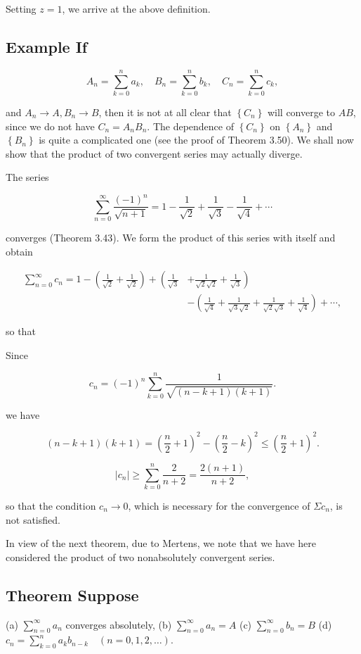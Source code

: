 \documentclass[10pt]{article}
\begin{document}
Setting $z=1$, we arrive at the above definition.

\subsection{Example If}
$$
A_{n}=\sum_{k=0}^{n} a_{k}, \quad B_{n}=\sum_{k=0}^{n} b_{k}, \quad C_{n}=\sum_{k=0}^{n} c_{k},
$$

and $A_{n} \rightarrow A, B_{n} \rightarrow B$, then it is not at all clear that $\left\{C_{n}\right\}$ will converge to $A B$, since we do not have $C_{n}=A_{n} B_{n}$. The dependence of $\left\{C_{n}\right\}$ on $\left\{A_{n}\right\}$ and $\left\{B_{n}\right\}$ is quite a complicated one (see the proof of Theorem 3.50). We shall now show that the product of two convergent series may actually diverge.

The series

$$
\sum_{n=0}^{\infty} \frac{(-1)^{n}}{\sqrt{n+1}}=1-\frac{1}{\sqrt{2}}+\frac{1}{\sqrt{3}}-\frac{1}{\sqrt{4}}+\cdots
$$

converges (Theorem 3.43). We form the product of this series with itself and obtain

$$
\begin{aligned}
\sum_{n=0}^{\infty} c_{n}=1-\left(\frac{1}{\sqrt{2}}+\frac{1}{\sqrt{2}}\right)+\left(\frac{1}{\sqrt{3}}\right. & \left.+\frac{1}{\sqrt{2} \sqrt{2}}+\frac{1}{\sqrt{3}}\right) \\
& -\left(\frac{1}{\sqrt{4}}+\frac{1}{\sqrt{3} \sqrt{2}}+\frac{1}{\sqrt{2} \sqrt{3}}+\frac{1}{\sqrt{4}}\right)+\cdots,
\end{aligned}
$$

so that

Since

$$
c_{n}=(-1)^{n} \sum_{k=0}^{n} \frac{1}{\sqrt{(n-k+1)(k+1)}} .
$$

we have

$$
(n-k+1)(k+1)=\left(\frac{n}{2}+1\right)^{2}-\left(\frac{n}{2}-k\right)^{2} \leq\left(\frac{n}{2}+1\right)^{2} .
$$

$$
\left|c_{n}\right| \geq \sum_{k=0}^{n} \frac{2}{n+2}=\frac{2(n+1)}{n+2},
$$

so that the condition $c_{n} \rightarrow 0$, which is necessary for the convergence of $\Sigma c_{n}$, is not satisfied.

In view of the next theorem, due to Mertens, we note that we have here considered the product of two nonabsolutely convergent series.

\subsection{Theorem Suppose}
(a) $\sum_{n=0}^{\infty} a_{n}$ converges absolutely,
(b) $\sum_{n=0}^{\infty} a_{n}=A$
(c) $\sum_{n=0}^{\infty} b_{n}=B$
(d) $c_{n}=\sum_{k=0}^{n} a_{k} b_{n-k} \quad(n=0,1,2, \ldots)$.
\end{document}
